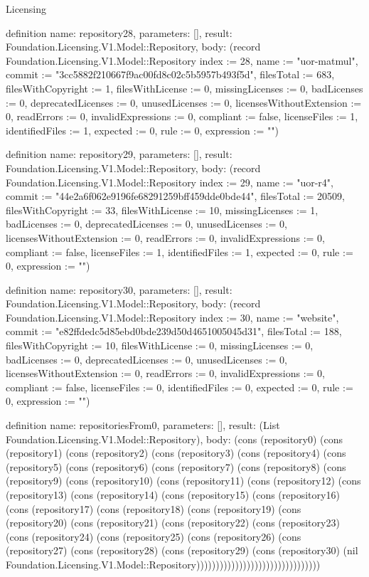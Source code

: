 \begin{lexlean}{Licensing}
\begin{semanticmodule}
definition{
  name: repository28,
  parameters: [],
  result: Foundation.Licensing.V1.Model::Repository,
  body: (record Foundation.Licensing.V1.Model::Repository {index := 28, name := "uor-matmul", commit := "3cc5882f210667f9ac00fd8c02c5b5957b493f5d", filesTotal := 683, filesWithCopyright := 1, filesWithLicense := 0, missingLicenses := 0, badLicenses := 0, deprecatedLicenses := 0, unusedLicenses := 0, licensesWithoutExtension := 0, readErrors := 0, invalidExpressions := 0, compliant := false, licenseFiles := 1, identifiedFiles := 1, expected := 0, rule := 0, expression := ""})
}

definition{
  name: repository29,
  parameters: [],
  result: Foundation.Licensing.V1.Model::Repository,
  body: (record Foundation.Licensing.V1.Model::Repository {index := 29, name := "uor-r4", commit := "44e2a6f062e9196fe68291259bff459dde0bde44", filesTotal := 20509, filesWithCopyright := 33, filesWithLicense := 10, missingLicenses := 1, badLicenses := 0, deprecatedLicenses := 0, unusedLicenses := 0, licensesWithoutExtension := 0, readErrors := 0, invalidExpressions := 0, compliant := false, licenseFiles := 1, identifiedFiles := 1, expected := 0, rule := 0, expression := ""})
}

definition{
  name: repository30,
  parameters: [],
  result: Foundation.Licensing.V1.Model::Repository,
  body: (record Foundation.Licensing.V1.Model::Repository {index := 30, name := "website", commit := "e82ffdedc5d85ebd0bde239d50d4651005045d31", filesTotal := 188, filesWithCopyright := 10, filesWithLicense := 0, missingLicenses := 0, badLicenses := 0, deprecatedLicenses := 0, unusedLicenses := 0, licensesWithoutExtension := 0, readErrors := 0, invalidExpressions := 0, compliant := false, licenseFiles := 0, identifiedFiles := 0, expected := 0, rule := 0, expression := ""})
}

definition{
  name: repositoriesFrom0,
  parameters: [],
  result: (List Foundation.Licensing.V1.Model::Repository),
  body: (cons (repository0) (cons (repository1) (cons (repository2) (cons (repository3) (cons (repository4) (cons (repository5) (cons (repository6) (cons (repository7) (cons (repository8) (cons (repository9) (cons (repository10) (cons (repository11) (cons (repository12) (cons (repository13) (cons (repository14) (cons (repository15) (cons (repository16) (cons (repository17) (cons (repository18) (cons (repository19) (cons (repository20) (cons (repository21) (cons (repository22) (cons (repository23) (cons (repository24) (cons (repository25) (cons (repository26) (cons (repository27) (cons (repository28) (cons (repository29) (cons (repository30) (nil Foundation.Licensing.V1.Model::Repository))))))))))))))))))))))))))))))))
}


\end{semanticmodule}
\end{lexlean}
